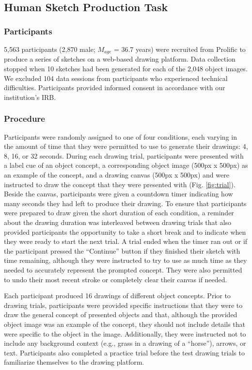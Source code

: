 \documentclass[10pt,letterpaper]{article}
\begin{document}
\subsection{Human Sketch Production Task} 
\subsubsection{Participants} 
5,563 participants (2,870 male; $M_{age}$ = 36.7 years) were recruited from Prolific to produce a series of sketches on a web-based drawing platform. 
Data collection stopped when 10 sketches had been generated for each of the 2,048 object images.
We excluded 104 data sessions from participants who experienced technical difficulties.
Participants provided informed consent in accordance with our institution’s IRB.

\subsubsection{Procedure}
Participants were randomly assigned to one of four conditions, each varying in the amount of time that they were permitted to use to generate their drawings: 4, 8, 16, or 32 seconds. 
During each drawing trial, participants were presented with a label cue of an object concept, a corresponding object image (500px x 500px) as an example of the concept, and a drawing canvas (500px x 500px) and were instructed to draw the concept that they were presented with (Fig. \ref{fig:trial}). 
Beside the canvas, participants were given a countdown timer indicating how many seconds they had left to produce their drawing. 
To ensure that participants were prepared to draw given the short duration of each condition, a reminder about the drawing duration was interleaved between drawing trials that also provided participants the opportunity to take a short break and to indicate when they were ready to start the next trial. 
A trial ended when the timer ran out or if the participant pressed the ``Continue'' button if they finished their sketch with time remaining, although they were instructed to try to use as much time as they needed to accurately represent the prompted concept.
They were also permitted to undo their most recent stroke or completely clear their canvas if needed. 

Each participant produced 16 drawings of different object concepts.
Prior to drawing trials, participants were provided specific instructions that they were to draw the general concept of presented objects and that, although the provided object image was an example of the concept, they should not include details that were specific to the object in the image. 
Additionally, they were instructed not to include any background context (e.g., grass in a drawing of a ``horse''), arrows, or text.
Participants also completed a practice trial before the test drawing trials to familiarize themselves to the drawing platform.
\end{document}
